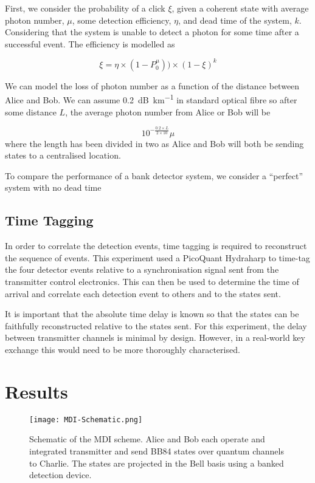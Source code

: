 First, we consider the probability of a click $\xi$, given a coherent state with average photon number, $\mu$, some detection efficiency, $\eta$, and dead time of the system, $k$. Considering that the system is unable to detect a photon for some time after a successful event. The efficiency is modelled as

\begin{equation}
	\xi = \eta \times ( 1 - P^\mu_0) ) \times (1 - \xi)^k
\end{equation}

We can model the loss of photon number as a function of the distance between Alice and Bob. We can assume \SI{0.2}{dB\per\km} in standard optical fibre so after some distance $L$, the average photon number from Alice or Bob will be

\begin{equation}
	10^{-\frac{0.2 \times L}{2 \times 10}} \mu
\end{equation}
where the length has been divided in two as Alice and Bob will both be sending states to a centralised location. 

To compare the performance of a bank detector system, we consider a ``perfect'' system with no dead time

\subsection{Time Tagging}

In order to correlate the detection events, time tagging is required to reconstruct the sequence of events. This experiment used a PicoQuant Hydraharp to time-tag the four detector events relative to a synchronisation signal sent from the transmitter control electronics. This can then be used to determine the time of arrival and correlate each detection event to others and to the states sent.

It is important that the absolute time delay is known so that the states can be faithfully reconstructed relative to the states sent. For this experiment, the delay between transmitter channels is minimal by design. However, in a real-world key exchange this would need to be more thoroughly characterised. 

\section{Results}

\begin{figure}[tp]
	\centering
	\texttt{[image: MDI-Schematic.png]}
	\caption[Chip-based MDI-QKD experimental schematic]{Schematic of the \ac{MDI} scheme. Alice and Bob each operate and integrated transmitter and send BB84 states over quantum channels to Charlie. The states are projected in the Bell basis using a banked detection device.}
	\label{fig:mdi-schem}
\end{figure}

